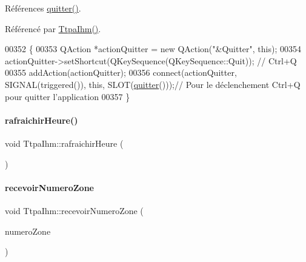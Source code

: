 Références \hyperlink{class_ttpa_ihm_af14988cbed7051af4eba326123cfb177}{quitter()}.



Référencé par \hyperlink{class_ttpa_ihm_ab3ed4b37a93ff04842414d4a98861d66}{Ttpa\+Ihm()}.


\begin{DoxyCode}
00352 \{
00353     QAction *actionQuitter = \textcolor{keyword}{new} QAction(\textcolor{stringliteral}{"&Quitter"}, \textcolor{keyword}{this});
00354     actionQuitter->setShortcut(QKeySequence(QKeySequence::Quit)); \textcolor{comment}{// Ctrl+Q}
00355     addAction(actionQuitter);
00356     connect(actionQuitter, SIGNAL(triggered()), \textcolor{keyword}{this}, SLOT(\hyperlink{class_ttpa_ihm_af14988cbed7051af4eba326123cfb177}{quitter}()));\textcolor{comment}{// Pour le déclenchement
       Ctrl+Q pour quitter l'application}
00357 \}
\end{DoxyCode}
\mbox{\label{class_ttpa_ihm_a3b0d10b212527273c03fa8e37543d037}} 
\paragraph{\texorpdfstring{rafraichir\+Heure()}{rafraichirHeure()}}
{\footnotesize\ttfamily void Ttpa\+Ihm\+::rafraichir\+Heure (\begin{DoxyParamCaption}{ }\end{DoxyParamCaption})\hspace{0.3cm}{\ttfamily [private]}}

\mbox{\label{class_ttpa_ihm_a0070bf0027c8a903e5bb5a543533e82c}} 
\paragraph{\texorpdfstring{recevoir\+Numero\+Zone}{recevoirNumeroZone}}
{\footnotesize\ttfamily void Ttpa\+Ihm\+::recevoir\+Numero\+Zone (\begin{DoxyParamCaption}\item[{Q\+String}]{numero\+Zone }\end{DoxyParamCaption})\hspace{0.3cm}{\ttfamily [slot]}}




